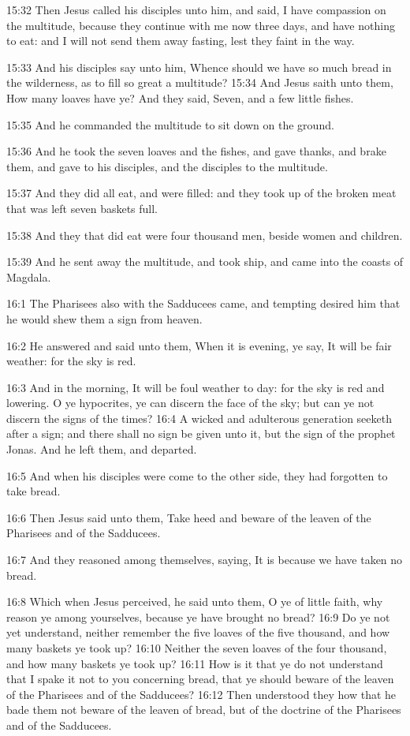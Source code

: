 15:32 Then Jesus called his disciples unto him, and said, I have compassion on the multitude, because they continue with me now three days, and have nothing to eat: and I will not send them away fasting, lest they faint in the way.

15:33 And his disciples say unto him, Whence should we have so much bread in the wilderness, as to fill so great a multitude?  15:34 And Jesus saith unto them, How many loaves have ye? And they said, Seven, and a few little fishes.

15:35 And he commanded the multitude to sit down on the ground.

15:36 And he took the seven loaves and the fishes, and gave thanks, and brake them, and gave to his disciples, and the disciples to the multitude.

15:37 And they did all eat, and were filled: and they took up of the broken meat that was left seven baskets full.

15:38 And they that did eat were four thousand men, beside women and children.

15:39 And he sent away the multitude, and took ship, and came into the coasts of Magdala.

16:1 The Pharisees also with the Sadducees came, and tempting desired him that he would shew them a sign from heaven.

16:2 He answered and said unto them, When it is evening, ye say, It will be fair weather: for the sky is red.

16:3 And in the morning, It will be foul weather to day: for the sky is red and lowering. O ye hypocrites, ye can discern the face of the sky; but can ye not discern the signs of the times?  16:4 A wicked and adulterous generation seeketh after a sign; and there shall no sign be given unto it, but the sign of the prophet Jonas. And he left them, and departed.

16:5 And when his disciples were come to the other side, they had forgotten to take bread.

16:6 Then Jesus said unto them, Take heed and beware of the leaven of the Pharisees and of the Sadducees.

16:7 And they reasoned among themselves, saying, It is because we have taken no bread.

16:8 Which when Jesus perceived, he said unto them, O ye of little faith, why reason ye among yourselves, because ye have brought no bread?  16:9 Do ye not yet understand, neither remember the five loaves of the five thousand, and how many baskets ye took up?  16:10 Neither the seven loaves of the four thousand, and how many baskets ye took up?  16:11 How is it that ye do not understand that I spake it not to you concerning bread, that ye should beware of the leaven of the Pharisees and of the Sadducees?  16:12 Then understood they how that he bade them not beware of the leaven of bread, but of the doctrine of the Pharisees and of the Sadducees.

